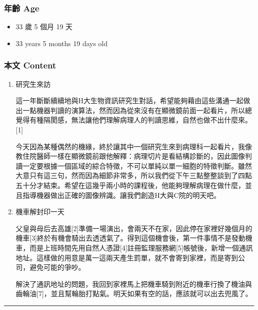 \documentclass[
]{article}
\providecommand{\tightlist}{%
  \setlength{\itemsep}{0pt}\setlength{\parskip}{0pt}}
\begin{document}
\hypertarget{ux5e74ux9f61-age-10}{%
\subsubsection{年齡 Age}\label{ux5e74ux9f61-age-10}}

\begin{itemize}
\tightlist
\item
  33 歲 5 個月 19 天
\item
  33 years 5 months 19 days old
\end{itemize}

\hypertarget{ux672cux6587-content-10}{%
\subsubsection{本文 Content}\label{ux672cux6587-content-10}}

\begin{enumerate}
\def\labelenumi{\arabic{enumi}.}
\item
  研究生來訪

  這一年斷斷續續地與H大生物資訊研究生對話，希望能夠藉由這些溝通一起做出一點機器判讀的演算法，然而因為從來沒有在顯微鏡前面一起看片，所以總覺得有種隔閡感，無法讓他們理解病理人的判讀思維，自然也做不出什麼來。{[}1{]}

  今天因為某種偶然的機緣，終於讓其中一個研究生來到病理科一起看片，我像教住院醫師一樣在顯微鏡前跟他解釋：病理切片是看結構診斷的，因此圖像判讀一定要根據一個區域的綜合特徵，不可以單純以單一細胞的特徵判斷。雖然大意只有這三句，然而因為細節非常多，所以我們從下午三點整整談到了四點五十分才結束。希望在這幾乎兩小時的課程後，他能夠理解病理在做什麼，並且指導機器做出正確的圖像辨識。讓我們創造H大與C院的明天吧。
\item
  機車解封印一天

  父皇與母后去高雄{[}2{]}準備一場演出，會兩天不在家，因此停在家裡好幾個月的機車{[}3{]}終於有機會騎出去透透氣了。得到這個機會後，第一件事情不是發動機車，而是上班時間先用自然人憑證{[}4{]}註冊監理服務網{[}5{]}帳號後，新增一個通訊地址。這樣做的用意是萬一這兩天產生罰單，就不會寄到家裡，而是寄到公司，避免可能的爭吵。

  解決了通訊地址的問題，我回到家裡馬上把機車騎到附近的機車行換了機油與齒輪油{[}7{]}，並且幫輪胎打點氣。明天如果有空的話，應該就可以出去兜風了。
\end{enumerate}

\begin{center}\rule{0.5\linewidth}{\linethickness}\end{center}
\end{document}
